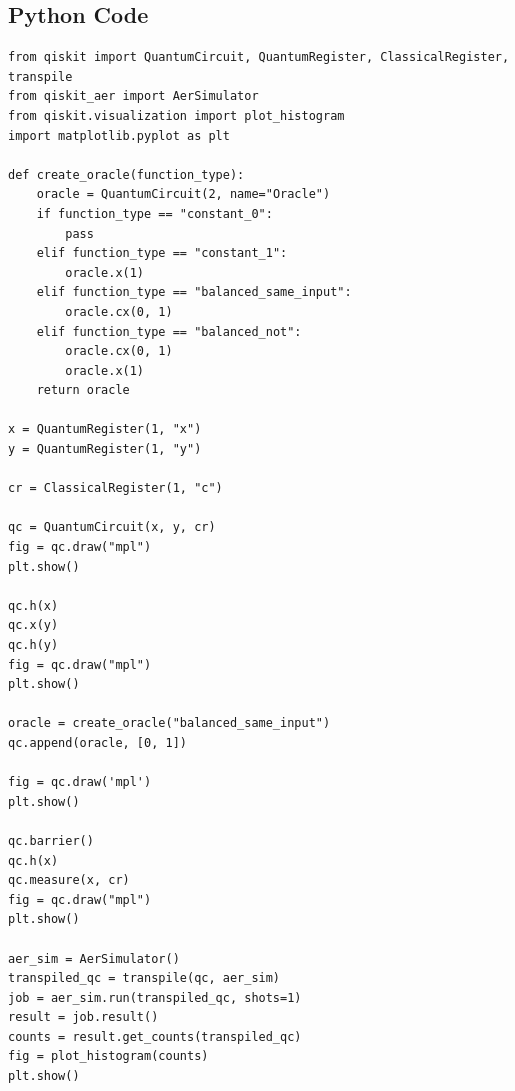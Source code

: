 \documentclass[12pt]{article}
\begin{document}
\subsection{Python Code}
\begin{verbatim}
from qiskit import QuantumCircuit, QuantumRegister, ClassicalRegister, transpile
from qiskit_aer import AerSimulator
from qiskit.visualization import plot_histogram
import matplotlib.pyplot as plt

def create_oracle(function_type):
    oracle = QuantumCircuit(2, name="Oracle")
    if function_type == "constant_0":
        pass
    elif function_type == "constant_1":
        oracle.x(1)
    elif function_type == "balanced_same_input":
        oracle.cx(0, 1)
    elif function_type == "balanced_not":
        oracle.cx(0, 1)
        oracle.x(1)
    return oracle

x = QuantumRegister(1, "x")
y = QuantumRegister(1, "y")

cr = ClassicalRegister(1, "c")

qc = QuantumCircuit(x, y, cr)
fig = qc.draw("mpl")
plt.show()

qc.h(x)
qc.x(y)
qc.h(y)
fig = qc.draw("mpl")
plt.show()

oracle = create_oracle("balanced_same_input")
qc.append(oracle, [0, 1])

fig = qc.draw('mpl')
plt.show()

qc.barrier()
qc.h(x)
qc.measure(x, cr)
fig = qc.draw("mpl")
plt.show()

aer_sim = AerSimulator()
transpiled_qc = transpile(qc, aer_sim)
job = aer_sim.run(transpiled_qc, shots=1)
result = job.result()
counts = result.get_counts(transpiled_qc)
fig = plot_histogram(counts)
plt.show()
\end{verbatim}
\end{document}
